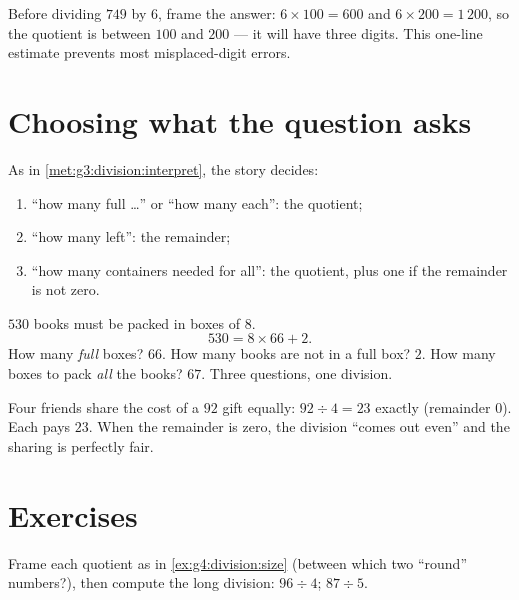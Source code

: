 \begin{example}\label{ex:g4:division:size}
Before dividing $749$ by $6$, frame the answer:
$6 \times 100 = 600$ and $6 \times 200 = 1\,200$, so the quotient is
between $100$ and $200$ --- it will have three digits. This one-line
estimate prevents most misplaced-digit errors.
\end{example}

\section{Choosing what the question asks}

\begin{method}\label{met:g4:division:interpret}
As in \cref{met:g3:division:interpret}, the story decides:
\begin{enumerate}
  \item ``how many full \dots'' or ``how many each'': the quotient;
  \item ``how many left'': the remainder;
  \item ``how many containers needed for all'': the quotient, plus
        one if the remainder is not zero.
\end{enumerate}
\end{method}

\begin{example}\label{ex:g4:division:problem}
$530$ books must be packed in boxes of $8$.
\[
530 = 8 \times 66 + 2 .
\]
How many \emph{full} boxes? $66$. How many books are not in a full
box? $2$. How many boxes to pack \emph{all} the books? $67$.
Three questions, one division.
\end{example}

\begin{example}\label{ex:g4:division:money}
Four friends share the cost of a $92$ gift equally:
$92 \div 4 = 23$ exactly (remainder $0$). Each pays $23$. When the
remainder is zero, the division ``comes out even'' and the sharing
is perfectly fair.
\end{example}

\section{Exercises}

\begin{exercise}[$\star$]\label{exo:g4:division:1}
Frame each quotient as in \cref{ex:g4:division:size} (between which
two ``round'' numbers?), then compute the long division:
$96 \div 4$; \quad $87 \div 5$.
\end{exercise}

